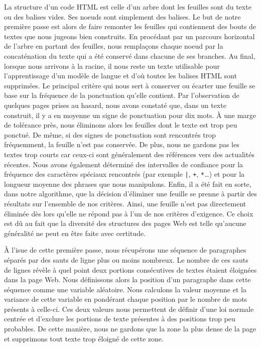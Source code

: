 La structure d'un code HTML est celle d'un arbre dont les feuilles sont du texte
ou des balises vides. Ses noeuds sont simplement des balises. Le but de notre
première passe est
alors de faire remonter les feuilles qui contiennent des bouts de textes que
nous jugeons bien construits. En procédant par un parcours horizontal de l'arbre
en partant des feuilles, nous remplaçons chaque noeud par la concaténation du
texte qui a été conservé dans chacune de ses branches. Au final, lorsque nous
arrivons à la racine, il nous reste un texte utilisable pour l'apprentissage
d'un modèle de langue et d'où toutes les balises HTML sont supprimées.
% 
Le principal critère qui nous sert à conserver ou écarter une feuille se base
sur la fréquence de la ponctuation qu'elle contient. Par l'observation de
quelques pages prises au hasard, nous avons constaté que, dans un texte
construit, il y a en moyenne un signe de ponctuation pour dix mots. \`A une
marge de tolérance près, nous éliminons alors les feuilles dont le texte est
trop peu ponctué. De même, si des signes de ponctuation sont rencontrés trop
fréquemment, la feuille n'est pas conservée. De plus, nous ne gardons pas les
textes trop courts car ceux-ci sont généralement des références vers des
actualités récentes. Nous avons également déterminé des intervalles de confiance
pour la fréquence des caractères spéciaux rencontrés (par exemple \texttt{|},
\texttt{+}, \texttt{*}\dots{}) et pour la longueur moyenne des phrases que nous
manipulons. Enfin, il a été fait en sorte, dans notre algorithme, que la
décision d'éliminer une feuille se prenne à partir des résultats sur l'ensemble
de nos critères. Ainsi, une feuille n'est pas directement éliminée dès lors
qu'elle ne répond pas à l'un de nos critères d'exigence. Ce choix est dû au fait
que la diversité des structures des pages Web est telle qu'aucune généralité ne
peut en être faite avec certitude.

À l'isue de cette première passe, nous récupérons une séquence de paragraphes
séparés par des sauts de ligne plus ou moins nombreux. Le nombre de ces sauts de
lignes révèle à quel point deux portions consécutives de textes étaient
éloignées dans la page Web. Nous définissons alors la position d'un paragraphe
dans cette séquence comme une variable aléatoire. Nous calculons la
valeur moyenne et la variance de cette variable en pondérant chaque position par
le nombre de mots présents à celle-ci. Ces deux valeurs nous permettent de
définir d'une loi normale centrée et d'exclure les portions de texte présentes
à des positions trop peu probables. De cette manière, nous ne gardons que la
zone la plus dense de la page et supprimons tout texte trop éloigné de cette
zone.

